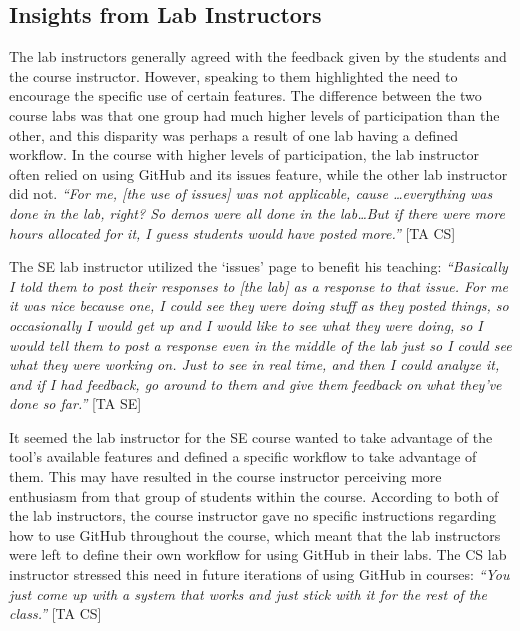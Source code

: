 

\subsection{Insights from Lab Instructors}
The lab instructors generally agreed with the feedback given by the students and the course instructor. However, speaking to them highlighted the need to encourage the specific use of certain features. The difference between the two course labs was that one group had much higher levels of participation than the other, and this disparity was perhaps a result of one lab having a defined workflow. In the course with higher levels of participation, the lab instructor often relied on using GitHub and its issues feature, while the other lab instructor did not. \textit{``For me, [the use of issues] was not applicable, cause \ldots everything was done in the lab, right? So demos were all done in the lab\ldots But if there were more hours allocated for it, I guess students would have posted more.''} [TA CS]

The SE lab instructor utilized the `issues' page to benefit his teaching: \textit{``Basically I told them to post their responses to [the lab] as a response to that issue. For me it was nice because one, I could see they were doing stuff as they posted things, so occasionally I would get up and I would like to see what they were doing, so I would tell them to post a response even in the middle of the lab just so I could see what they were working on. Just to see in real time, and then I could analyze it, and if I had feedback, go around to them and give them feedback on what they've done so far.''} [TA SE]

It seemed the lab instructor for the SE course wanted to take advantage of the tool's available features and defined a specific workflow to take advantage of them. This may have resulted in the course instructor perceiving more enthusiasm from that group of students within the course. According to both of the lab instructors, the course instructor gave no specific instructions regarding how to use GitHub throughout the course, which meant that the lab instructors were left to define their own workflow for using GitHub in their labs. The CS lab instructor stressed this need in future iterations of using GitHub in courses: \textit{``You just come up with a system that works and just stick with it for the rest of the class.''} [TA CS]

